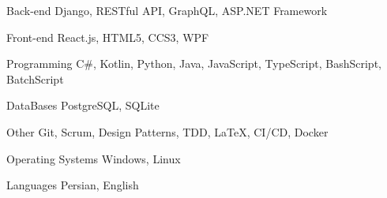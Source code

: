 

\begin{cvskills}

  \cvskill
  {Back-end} %
  {Django, RESTful API, GraphQL, ASP.NET Framework} %

  \cvskill
  {Front-end} %
  {React.js, HTML5, CCS3, WPF} %

  \cvskill
  {Programming} %
  {C\#, Kotlin, Python, Java, JavaScript, TypeScript, BashScript, BatchScript} %

  \cvskill
  {DataBases} %
  {PostgreSQL, SQLite} %


  \cvskill
  {Other} %
  {Git, Scrum, Design Patterns, TDD, \LaTeX, CI/CD, Docker} %


  \cvskill
  {Operating Systems} %
  {Windows, Linux} %


  \cvskill
  {Languages} %
  {Persian, English} %


\end{cvskills}
